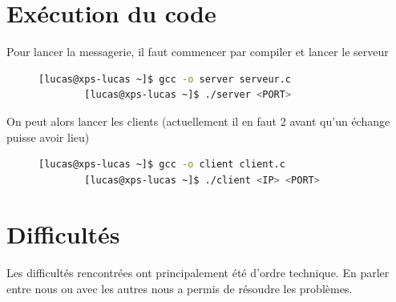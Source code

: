 \documentclass[a4paper,12pt]{article}
\begin{document}
\section{Exécution du code}
Pour lancer la messagerie, il faut commencer par compiler et lancer le serveur
\begin{figure}[h]
	\centering
	\vspace{-0.1cm}
	\begin{lstlisting}[language=bash, gobble=4]
		[lucas@xps-lucas ~]$ gcc -o server serveur.c
		[lucas@xps-lucas ~]$ ./server <PORT>
	\end{lstlisting}
\end{figure}

\noindent On peut alors lancer les clients (actuellement il en faut 2 avant qu'un échange puisse avoir lieu)
\begin{figure}[h]
	\centering
	\vspace{-0.2cm}
	\begin{lstlisting}[language=bash, gobble=4]
		[lucas@xps-lucas ~]$ gcc -o client client.c
		[lucas@xps-lucas ~]$ ./client <IP> <PORT>
	\end{lstlisting}
\end{figure}
\section{Difficultés}
Les difficultés rencontrées ont principalement été d'ordre technique. En parler entre nous ou avec les autres nous a permis de résoudre les problèmes.
\end{document}
